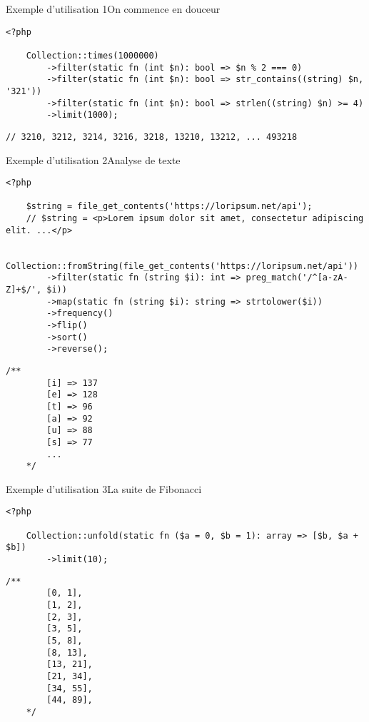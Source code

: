 \begin{frame}[fragile]{Exemple d'utilisation 1}{On commence en douceur}
    \begin{lstlisting}[firstnumber=1]
    <?php

    Collection::times(1000000)
        ->filter(static fn (int $n): bool => $n % 2 === 0)
        ->filter(static fn (int $n): bool => str_contains((string) $n, '321'))
        ->filter(static fn (int $n): bool => strlen((string) $n) >= 4)
        ->limit(1000);
    \end{lstlisting}

    \pause

    \begin{lstlisting}[firstnumber=9]
    // 3210, 3212, 3214, 3216, 3218, 13210, 13212, ... 493218
    \end{lstlisting}
\end{frame}

\begin{frame}[fragile]{Exemple d'utilisation 2}{Analyse de texte}
    \begin{lstlisting}[firstnumber=1]
    <?php

    $string = file_get_contents('https://loripsum.net/api');
    // $string = <p>Lorem ipsum dolor sit amet, consectetur adipiscing elit. ...</p>

    Collection::fromString(file_get_contents('https://loripsum.net/api'))
        ->filter(static fn (string $i): int => preg_match('/^[a-zA-Z]+$/', $i))
        ->map(static fn (string $i): string => strtolower($i))
        ->frequency()
        ->flip()
        ->sort()
        ->reverse();
    \end{lstlisting}

    \pause

    \begin{lstlisting}[firstnumber=14]
    /**
        [i] => 137
        [e] => 128
        [t] => 96
        [a] => 92
        [u] => 88
        [s] => 77
        ...
    */
    \end{lstlisting}
\end{frame}

\begin{frame}[fragile]{Exemple d'utilisation 3}{La suite de Fibonacci}
    \begin{lstlisting}[firstnumber=1]
    <?php

    Collection::unfold(static fn ($a = 0, $b = 1): array => [$b, $a + $b])
        ->limit(10);
    \end{lstlisting}

    \pause

    \begin{lstlisting}[firstnumber=6]
    /**
        [0, 1],
        [1, 2],
        [2, 3],
        [3, 5],
        [5, 8],
        [8, 13],
        [13, 21],
        [21, 34],
        [34, 55],
        [44, 89],
    */
    \end{lstlisting}
\end{frame}

